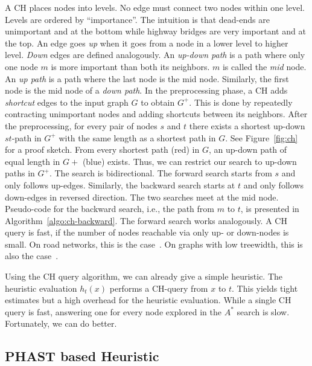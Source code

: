 \documentclass[a4paper,UKenglish,cleveref, autoref, thm-restate]{lipics-v2021}
\begin{document}
A CH places nodes into levels.
No edge must connect two nodes within one level.
Levels are ordered by ``importance''.
The intuition is that dead-ends are unimportant and at the bottom while highway bridges are very important and at the top.
An edge goes \emph{up} when it goes from a node in a lower level to higher level.
\emph{Down} edges are defined analogously.
An \emph{up-down path} is a path where only one node $m$ is more important than both its neighbors.
$m$ is called the \emph{mid} node.
An \emph{up path} is a path where the last node is the mid node.
Similarly, the first node is the mid node of a \emph{down path}.
%
In the preprocessing phase, a CH adds \emph{shortcut} edges to the input graph $G$ to obtain $G^+$.
This is done by repeatedly contracting unimportant nodes and adding shortcuts between its neighbors.
After the preprocessing, for every pair of nodes $s$ and $t$ there exists a shortest up-down $st$-path in $G^+$ with the same length as a shortest path in $G$.
See Figure~\ref{fig:ch} for a proof sketch.
From every shortest path (red) in $G$, an up-down path of equal length in $G+$ (blue) exists.
Thus, we can restrict our search to up-down paths in $G^+$.
The search is bidirectional.
The forward search starts from $s$ and only follows up-edges.
Similarly, the backward search starts at $t$ and only follows down-edges in reversed direction.
The two searches meet at the mid node.
Pseudo-code for the backward search, i.e., the path from $m$ to $t$, is presented in Algorithm~\ref{algo:ch-backward}.
The forward search works analogously.
%
A CH query is fast, if the number of nodes reachable via only up- or down-nodes is small.
On road networks, this is the case~\cite{gssv-erlrn-12,dgpw-crprn-13}.
On graphs with low treewidth, this is also the case~\cite{dsw-cch-15,hs-gbpo-18}.

Using the CH query algorithm, we can already give a simple heuristic.
The heuristic evaluation $h_t(x)$ performs a CH-query from $x$ to $t$.
This yields tight estimates but a high overhead for the heuristic evaluation.
While a single CH query is fast, answering one for every node explored in the $A^*$ search is slow.
Fortunately, we can do better.

\subsection{PHAST based Heuristic}
\end{document}
